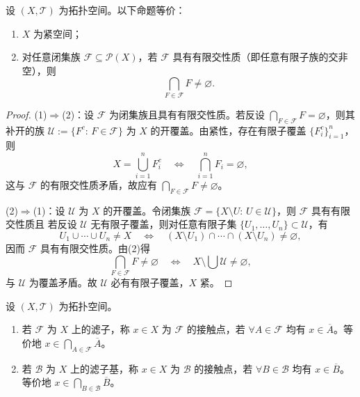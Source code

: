 \documentclass[lang=cn,a4paper,newtx,figureplace=section,tableplace=section]{elegantbook}
\begin{document}
 \begin{proposition}\label{prop:compact-FIP}
 设 $(X,\mathcal T)$ 为拓扑空间。以下命题等价：
 \begin{enumerate}
   \item $X$ 为紧空间；
   \item 对任意闭集族 $\mathcal F\subseteq\mathcal P(X)$，若 $\mathcal F$ 具有有限交性质（即任意有限子族的交非空），则
   \[
   \bigcap_{F\in\mathcal F} F \neq \varnothing.
   \]
 \end{enumerate}
 \end{proposition}
 \begin{proof}
 (1)$\Rightarrow$(2)：设 $\mathcal F$ 为闭集族且具有有限交性质。若反设 $\bigcap_{F\in\mathcal F}F=\varnothing$，则其补开的族 $\mathcal U:=\{F^c:\,F\in\mathcal F\}$ 为 $X$ 的开覆盖。由紧性，存在有限子覆盖 $\{F_i^c\}_{i=1}^n$，则
 \[
 X=\bigcup_{i=1}^n F_i^c \quad\Longleftrightarrow\quad \bigcap_{i=1}^n F_i=\varnothing,
 \]
 这与 $\mathcal F$ 的有限交性质矛盾，故应有 $\bigcap_{F\in\mathcal F}F\neq\varnothing$。
 
 (2)$\Rightarrow$(1)：设 $\mathcal U$ 为 $X$ 的开覆盖。令闭集族 $\mathcal F=\{X\setminus U:\,U\in\mathcal U\}$，则 $\mathcal F$ 具有有限交性质且
 若反设 $\mathcal U$ 无有限子覆盖，则对任意有限子集 $\{U_1,\dots,U_n\}\subset\mathcal U$，有
 \[
 U_1\cup\cdots\cup U_n\ne X\quad\Longleftrightarrow\quad (X\setminus U_1)\cap\cdots\cap(X\setminus U_n)\ne\varnothing,
 \]
 因而 $\mathcal F$ 具有有限交性质。由(2)得
 \[
 \bigcap_{F\in\mathcal F}F\ne\varnothing\quad\Longleftrightarrow\quad X\setminus\bigcup\mathcal U\ne\varnothing,
 \]
 与 $\mathcal U$ 为覆盖矛盾。故 $\mathcal U$ 必有有限子覆盖，$X$ 紧。
 \end{proof}
 
  \begin{definition}[滤子与滤子基的接触点]\label{def:filter-adherent}
 设 $(X,\mathcal T)$ 为拓扑空间。
\begin{enumerate}
    \item 若 $\mathcal F$ 为 $X$ 上的滤子，称 $x\in X$ 为 $\mathcal F$ 的接触点，若 $\forall A\in\mathcal F$ 均有 $x\in \overline{A}$。等价地 $x\in \bigcap_{A\in\mathcal F}\overline{A}$。
    \item 若 $\mathcal B$ 为 $X$ 上的滤子基，称 $x\in X$ 为 $\mathcal B$ 的接触点，若 $\forall B\in\mathcal B$ 均有 $x\in \overline{B}$。等价地 $x\in \bigcap_{B\in\mathcal B}\overline{B}$。
  \end{enumerate}
  \end{definition}
  
\end{document}
